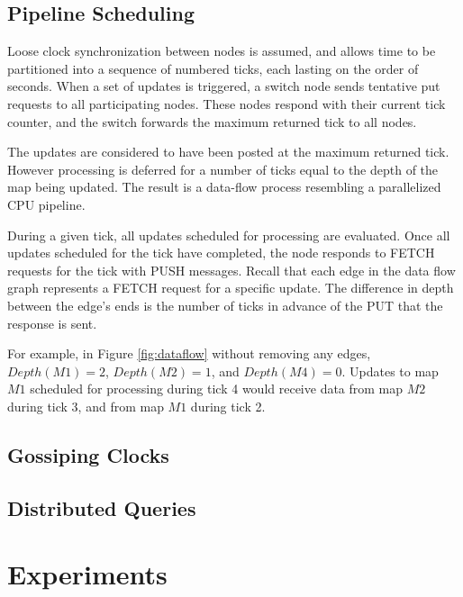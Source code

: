 \documentclass{sig-alternate}
\begin{document}
\subsection{Pipeline Scheduling}
Loose clock synchronization between nodes is assumed, and allows time to be partitioned into a sequence of numbered ticks, each lasting on the order of seconds.  When a set of updates is triggered, a switch node sends tentative put requests to all participating nodes.  These nodes respond with their current tick counter, and the switch forwards the maximum returned tick to all nodes.

The updates are considered to have been posted at the maximum returned tick.  However processing is deferred for a number of ticks equal to the depth of the map being updated.  The result is a data-flow process resembling a parallelized CPU pipeline.

During a given tick, all updates scheduled for processing are evaluated.  Once all updates scheduled for the tick have completed, the node responds to FETCH requests for the tick with PUSH messages.  Recall that each edge in the data flow graph represents a FETCH request for a specific update.  The difference in depth between the edge's ends is the number of ticks in advance of the PUT that the response is sent.  

For example, in Figure \ref{fig:dataflow} without removing any edges, $Depth(M1) = 2$, $Depth(M2) = 1$, and $Depth(M4) = 0$.  Updates to map $M1$ scheduled for processing during tick 4 would receive data from map $M2$ during tick 3, and from map $M1$ during tick 2.

\subsection{Gossiping Clocks}

\subsection{Distributed Queries}


\section{Experiments}
\label{sec:experiments}



\end{document}
